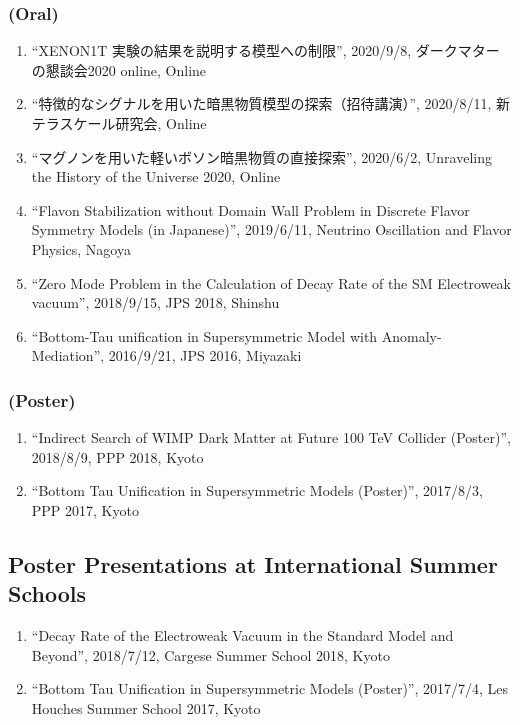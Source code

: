 \documentclass[12pt]{article}
\begin{document}
\subsubsection*{(Oral)}
\begin{enumerate}
 \item ``XENON1T 実験の結果を説明する模型への制限'', 2020/9/8, ダークマターの懇談会2020 online, Online
 \item ``特徴的なシグナルを用いた暗黒物質模型の探索（招待講演）'', 2020/8/11, 新テラスケール研究会, Online
 \item ``マグノンを用いた軽いボソン暗黒物質の直接探索'', 2020/6/2, Unraveling the History of the Universe 2020, Online
 \item ``Flavon Stabilization without Domain Wall Problem in Discrete Flavor Symmetry Models (in Japanese)'', 2019/6/11, Neutrino Oscillation and Flavor Physics, Nagoya
 \item ``Zero Mode Problem in the Calculation of Decay Rate of the SM Electroweak vacuum'', 2018/9/15, JPS 2018, Shinshu
 \item ``Bottom-Tau unification in Supersymmetric Model with Anomaly-Mediation'', 2016/9/21, JPS 2016, Miyazaki
\end{enumerate}
\subsubsection*{(Poster)}
\begin{enumerate}
 \item ``Indirect Search of WIMP Dark Matter at Future 100 TeV Collider (Poster)'', 2018/8/9, PPP 2018, Kyoto
 \item ``Bottom Tau Unification in Supersymmetric Models (Poster)'', 2017/8/3, PPP 2017, Kyoto
\end{enumerate}

\subsection*{Poster Presentations at International Summer Schools}
\begin{enumerate}
 \item ``Decay Rate of the Electroweak Vacuum in the Standard Model and Beyond'', 2018/7/12, Cargese Summer School 2018, Kyoto
 \item ``Bottom Tau Unification in Supersymmetric Models (Poster)'', 2017/7/4, Les Houches Summer School 2017, Kyoto
\end{enumerate}
\end{document}
